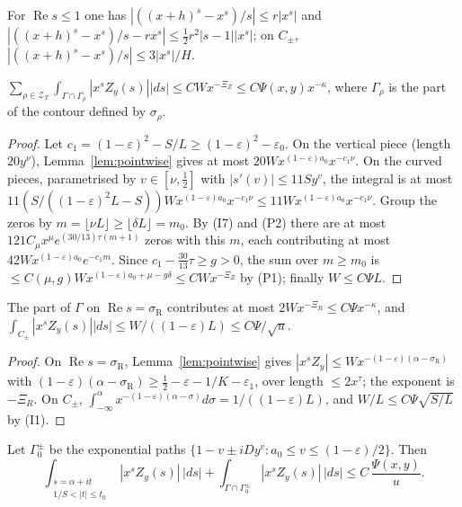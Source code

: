 For $\operatorname{Re}s\le1$ one has $|((x+h)^s-x^s)/s|\le r|x^s|$ and
$|((x+h)^s-x^s)/s-rx^s|\le\tfrac12r^2|s-1||x^s|$; on $C_\pm$, $|((x+h)^s-x^s)/s|\le3|x^s|/H$.

\begin{lemma}[zeros]\label{lem:zeros}
$\sum_{\rho\in\mathcal Z_T}\int_{\Gamma\cap\Gamma_\rho}|x^sZ_y(s)||ds|\le CWx^{-\Xi_Z}\le C\Psi(x,y)x^{-\kappa}$,
where $\Gamma_\rho$ is the part of the contour defined by $\sigma_\rho$.
\end{lemma}

\begin{proof}
Let $c_1=(1-\varepsilon)^2-S/L\ge(1-\varepsilon)^2-\varepsilon_0$. On the vertical piece (length $20y^\nu$),
Lemma~\ref{lem:pointwise} gives at most $20Wx^{(1-\varepsilon)a_0}x^{-c_1\nu}$. On the curved pieces,
parametrised by $v\in[\nu,\tfrac12]$ with $|s'(v)|\le11Sy^v$, the integral is at most
$11(S/((1-\varepsilon)^2L-S))Wx^{(1-\varepsilon)a_0}x^{-c_1\nu}\le11Wx^{(1-\varepsilon)a_0}x^{-c_1\nu}$. Group the
zeros by $m=\lfloor\nu L\rfloor\ge\lfloor\delta L\rfloor=m_0$. By (I7) and (P2) there are at most
$121C_\mu x^\mu e^{(30/13)\tau(m+1)}$ zeros with this $m$, each contributing at most $42Wx^{(1-\varepsilon)a_0}e^{-c_1m}$.
Since $c_1-\tfrac{30}{13}\tau\ge g>0$, the sum over $m\ge m_0$ is
$\le C(\mu,g)Wx^{(1-\varepsilon)a_0+\mu-g\delta}\le CWx^{-\Xi_Z}$ by (P1); finally $W\le C\Psi L$.
\end{proof}

\begin{lemma}\label{lem:remainder}
The part of $\Gamma$ on $\operatorname{Re}s=\sigma_{\mathrm R}$ contributes at most $2Wx^{-\Xi_R}\le C\Psi x^{-\kappa}$, and
$\int_{C_\pm}|x^sZ_y(s)||ds|\le W/((1-\varepsilon)L)\le C\Psi/\sqrt u$.
\end{lemma}

\begin{proof}
On $\operatorname{Re}s=\sigma_{\mathrm R}$, Lemma~\ref{lem:pointwise} gives
$|x^sZ_y|\le Wx^{-(1-\varepsilon)(\alpha-\sigma_{\mathrm R})}$ with $(1-\varepsilon)(\alpha-\sigma_{\mathrm R})\ge\tfrac12-\varepsilon-1/K-\varepsilon_1$, over length $\le2x^\tau$; the exponent is
$-\Xi_R$. On $C_\pm$, $\int_{-\infty}^\alpha x^{-(1-\varepsilon)(\alpha-\sigma)}d\sigma=1/((1-\varepsilon)L)$, and
$W/L\le C\Psi\sqrt{S/L}$ by (I1).
\end{proof}

\begin{lemma}\label{lem:central}
Let $\Gamma_0^\pm$ be the exponential paths $\{1-v\pm iDy^v:a_0\le v\le(1-\varepsilon)/2\}$. Then
\[
\int_{\substack{s=\alpha+it\\1/S<|t|\le t_0}}|x^sZ_y(s)|\,|ds|+\int_{\Gamma\cap\Gamma_0^\pm}|x^sZ_y(s)|\,|ds|
\le C\,\frac{\Psi(x,y)}u .
\]
\end{lemma}

